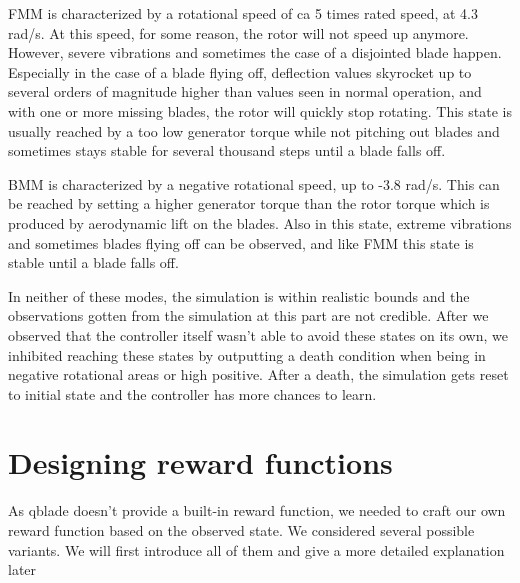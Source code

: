 \documentclass[hyperref,beleg]{cgvpub}
\begin{document}
\ac{FMM} is characterized by a rotational speed of ca 5 times rated speed, at 4.3 rad/s. At this speed, for some reason, the rotor will not speed up anymore. However, severe vibrations and sometimes the case of a disjointed blade happen. Especially in the case of a blade flying off, deflection values skyrocket up to several orders of magnitude higher than values seen in normal operation, and with one or more missing blades, the rotor will quickly stop rotating. This state is usually reached by a too low generator torque while not pitching out blades and sometimes stays stable for several thousand steps until a blade falls off.

\ac{BMM} is characterized by a negative rotational speed, up to -3.8 rad/s. This can be reached by setting a higher generator torque than the rotor torque which is produced by aerodynamic lift on the blades. Also in this state, extreme vibrations and sometimes blades flying off can be observed, and like \ac{FMM} this state is stable until a blade falls off. 

In neither of these modes, the simulation is within realistic bounds and the observations gotten from the simulation at this part are not credible. After we observed that the controller itself wasn't able to avoid these states on its own, we inhibited reaching these states by outputting a death condition when being in negative rotational areas or high positive. After a death, the simulation gets reset to initial state and the controller has more chances to learn.


\section{Designing reward functions}
\label{rewardfunctions}

As qblade doesn't provide a built-in reward function, we needed to craft our own reward function based on the observed state. We considered several possible variants. We will first introduce all of them and give a more detailed explanation later
\end{document}
